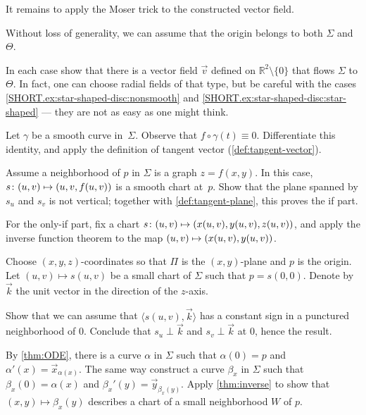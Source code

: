 \begin{multicols}{2}
It remains to apply the Moser trick to the constructed vector field. 

Without loss of generality, we can assume that the origin belongs to both $\Sigma$ and~$\Theta$.

In each case show that there is a vector field $\vec v$ defined on $\mathbb{R}^2\setminus\{0\}$ that flows $\Sigma$ to $\Theta$.
In fact, one can choose radial fields of that type,
but be careful with the cases \ref{SHORT.ex:star-shaped-disc:nonsmooth} and \ref{SHORT.ex:star-shaped-disc:star-shaped} --- they are not as easy as one might think.


\setcounter{eqtn}{0}

Let $\gamma$ be a smooth curve in~$\Sigma$.
Observe that $f\circ\gamma(t)\equiv 0$.
Differentiate this identity, and apply the definition of tangent vector (\ref{def:tangent-vector}).

Assume a neighborhood of $p$ in $\Sigma$ is a graph $z=f(x,y)$.
In this case, $s\:(u,v)\z\mapsto (u,v,f(u,v))$ is a smooth chart at~$p$.
Show that the plane spanned by $s_u$ and $s_v$ is not vertical;
together with \ref{def:tangent-plane}, this proves the if part.

For the only-if part, fix a chart 
$s\:(u,v)\z\mapsto(x(u,v),y(u,v),z(u,v))$,
and apply the inverse function theorem to the map $(u,v)\z\mapsto(x(u,v),y(u,v))$.

Choose $(x,y,z)$-coordinates so that $\Pi$ is the $(x,y)$-plane and $p$ is the origin.
Let $(u,v)\mapsto s(u,v)$ be a small chart of $\Sigma$ such that $p=s(0,0)$.
Denote by $\vec k$ the unit vector in the direction of the $z$-axis.

Show that we can assume that $\langle s(u,v),\vec k\rangle$ has a constant sign in a punctured neighborhood of $0$.
Conclude that $s_u\perp \vec k$ and $s_v\perp \vec k$ at
$0$, hence the result.

By \ref{thm:ODE}, there is a curve $\alpha$ in $\Sigma$ such that $\alpha(0)=p$ and $\alpha'(x)=\vec x_{\alpha(x)}$.
The same way construct a curve $\beta_x$ in $\Sigma$ such that $\beta_x(0)=\alpha(x)$ and $\beta_x'(y)=\vec y_{\beta_x(y)}$.
Apply \ref{thm:inverse} to show that $(x,y)\mapsto \beta_x(y)$ describes a chart of a small neighborhood $W$ of $p$.


\end{multicols}
